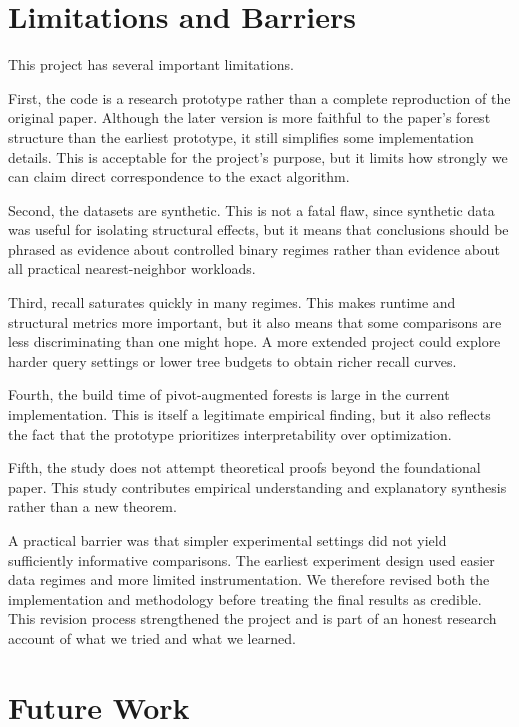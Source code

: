 \documentclass[11pt]{article}
\begin{document}
\section{Limitations and Barriers}

This project has several important limitations.

First, the code is a research prototype rather than a complete reproduction of the original paper. Although the later version is more faithful to the paper's forest structure than the earliest prototype, it still simplifies some implementation details. This is acceptable for the project's purpose, but it limits how strongly we can claim direct correspondence to the exact algorithm.

Second, the datasets are synthetic. This is not a fatal flaw, since synthetic data was useful for isolating structural effects, but it means that conclusions should be phrased as evidence about controlled binary regimes rather than evidence about all practical nearest-neighbor workloads.

Third, recall saturates quickly in many regimes. This makes runtime and structural metrics more important, but it also means that some comparisons are less discriminating than one might hope. A more extended project could explore harder query settings or lower tree budgets to obtain richer recall curves.

Fourth, the build time of pivot-augmented forests is large in the current implementation. This is itself a legitimate empirical finding, but it also reflects the fact that the prototype prioritizes interpretability over optimization.

Fifth, the study does not attempt theoretical proofs beyond the foundational paper. This study contributes empirical understanding and explanatory synthesis rather than a new theorem.

A practical barrier was that simpler experimental settings did not yield sufficiently informative comparisons. The earliest experiment design used easier data regimes and more limited instrumentation. We therefore revised both the implementation and methodology before treating the final results as credible. This revision process strengthened the project and is part of an honest research account of what we tried and what we learned.

\section{Future Work}
\end{document}
